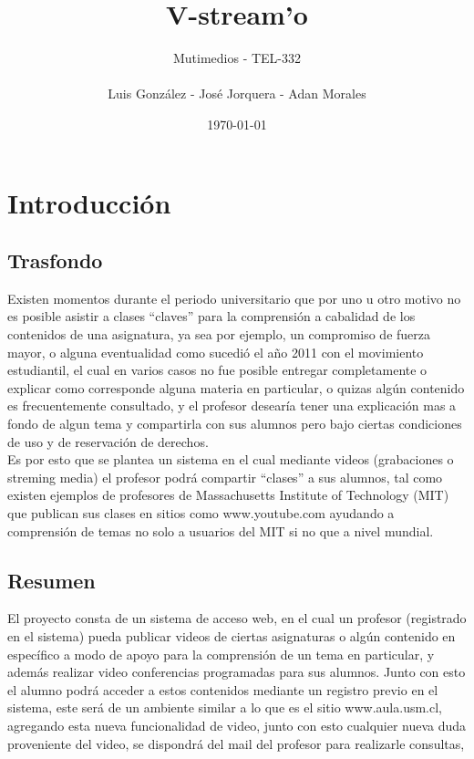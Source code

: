 \documentclass[12pt]{article}
\title{V-stream'o}
\author{Mutimedios - TEL-332\\\\Luis González - José Jorquera - Adan Morales}
\date{\today}
\begin{document}
\maketitle
\thispagestyle{empty}

\newpage
\section{Introducción}
\subsection{Trasfondo}
Existen momentos durante el periodo universitario que por uno u otro motivo no es posible asistir a clases 
``claves'' para la comprensión a cabalidad de los contenidos de una asignatura, ya sea por ejemplo, un 
compromiso de fuerza mayor, o alguna eventualidad como sucedió el a\~no 2011 con el movimiento estudiantil, 
el cual en varios casos no fue posible entregar completamente o explicar como corresponde alguna materia 
en particular, o quizas algún contenido es frecuentemente consultado, y el profesor desearía tener una 
explicación mas a fondo de algun tema y compartirla con sus alumnos pero bajo ciertas condiciones de uso
y de reservación de derechos.\\

Es por esto que se plantea un sistema en el cual mediante videos (grabaciones o streming media) el profesor
podrá compartir ``clases'' a sus alumnos, tal como existen ejemplos de profesores de Massachusetts Institute 
of Technology (MIT) que publican sus clases en sitios como www.youtube.com ayudando a comprensión de temas
no solo a usuarios del MIT si no que a nivel mundial.

\subsection{Resumen}
El proyecto consta de un sistema de acceso web, en el cual un profesor (registrado en el sistema) pueda 
publicar videos de ciertas asignaturas o algún contenido en específico a modo de apoyo para la comprensión
de un tema en particular, y además realizar video conferencias programadas para sus alumnos. Junto con esto
el alumno podrá acceder a estos contenidos mediante un registro previo en el sistema,
este será de un ambiente similar a lo que es el sitio www.aula.usm.cl, agregando esta nueva
funcionalidad de video, junto con esto cualquier nueva duda proveniente del video, se dispondrá del mail 
del profesor para realizarle consultas, %
\end{document}
